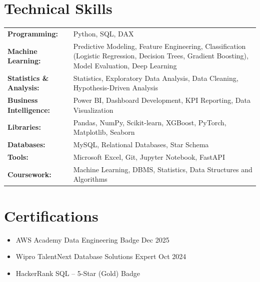 \documentclass[a4paper,12pt]{article}
\begin{document}
\section{Technical Skills}
\begin{tabularx}{\linewidth}{@{}l X@{}}
\textbf{Programming:} & \normalsize{Python, SQL, DAX}\\
\textbf{Machine Learning:} & \normalsize{Predictive Modeling, Feature Engineering, Classification (Logistic Regression, Decision Trees, Gradient Boosting), Model Evaluation, Deep Learning}\\
\textbf{Statistics \& Analysis:} & \normalsize{Statistics, Exploratory Data Analysis, Data Cleaning, Hypothesis-Driven Analysis}\\
\textbf{Business Intelligence:} & \normalsize{Power BI, Dashboard Development, KPI Reporting, Data Visualization}\\
\textbf{Libraries:} & \normalsize{Pandas, NumPy, Scikit-learn, XGBoost, PyTorch, Matplotlib, Seaborn}\\
\textbf{Databases:} & \normalsize{MySQL, Relational Databases, Star Schema}\\
\textbf{Tools:} & \normalsize{Microsoft Excel, Git, Jupyter Notebook, FastAPI}\\
\textbf{Coursework:} & \normalsize{Machine Learning, DBMS, Statistics, Data Structures and Algorithms}\\

\end{tabularx}


\section{Certifications}

\begin{itemize}[leftmargin=1em, itemsep=10pt, label=--]
    \item AWS Academy Data Engineering Badge \hfill Dec 2025
    \item Wipro TalentNext Database Solutions Expert \hfill Oct 2024
    \item HackerRank SQL -- 5-Star (Gold) Badge
\end{itemize}


\vfill
\center
\end{document}

